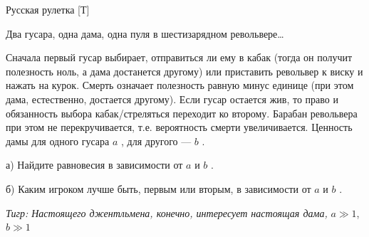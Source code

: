 \begin{problem}
 Русская рулетка [Т]

Два гусара, одна дама, одна пуля в шестизарядном револьвере\ldots

Сначала первый гусар выбирает, отправиться ли ему в кабак (тогда он получит полезность ноль, а дама достанется другому) или приставить револьвер к виску и нажать на курок. Смерть означает полезность равную минус единице (при этом дама, естественно, достается другому). Если гусар остается жив, то право и обязанность выбора кабак/стреляться переходит ко второму. Барабан револьвера при этом не перекручивается, т.е. вероятность смерти увеличивается. Ценность дамы для одного гусара  $a$ , для другого —  $b$ .

а) Найдите равновесия в зависимости от  $a$  и  $b$ .

б) Каким игроком лучше быть, первым или вторым, в зависимости от   $a$  и  $b$ .

{\it Тигр: Настоящего джентльмена, конечно, интересует настоящая дама, } $a\gg 1$, $b\gg 1$




\end{problem}
